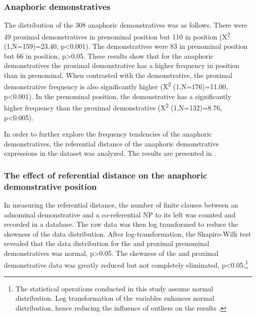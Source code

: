 \documentclass[output=paper,
modfonts
]{langscibook}
\begin{document}
\subsubsection{Anaphoric demonstratives}\label{sec:mwamzandi:3.1.2}

The distribution of the 308 anaphoric demonstratives was as follows. There were 49 proximal demonstratives in prenominal position but 110 in  position (X\textsuperscript{2} (1,N=159)=23.40, p<0.001). The  demonstratives were 83 in prenominal position but 66 in  position, p>0.05. These results show that for the anaphoric demonstratives the proximal demonstrative has a higher frequency in  position than in prenominal. When contrasted with the   demonstrative, the proximal  demonstrative frequency is also significantly higher (X\textsuperscript{2} (1,N=176)=11.00, p<0.001). In the prenominal position, the  demonstrative has a significantly higher frequency than the proximal demonstrative (X\textsuperscript{2} (1,N=132)=8.76, p<0.005).

In order to further explore the frequency tendencies of the anaphoric demonstratives, the referential distance of the anaphoric demonstrative expressions in the dataset was analyzed. The results are presented in .

\subsubsection{The effect of referential distance on the anaphoric demonstrative position}\label{sec:mwamzandi:3.1.3}

In measuring the referential distance, the number of finite clauses between an adnominal demonstrative and a co-referential NP to its left was counted and recorded in a database. The raw data was then log transformed to reduce the skewness of the data distribution. After log-transformation, the Shapiro-Wilk test revealed that the data distribution for the  and proximal prenominal demonstratives was normal, p>0.05. The skewness of the  and proximal  demonstrative data was greatly reduced but not completely eliminated, p<0.05.\footnote{The statistical operations conducted in this study assume normal distribution. Log transformation of the variables enhances normal distribution, hence reducing the influence of outliers on the results \citep{Baayen2008}.}
\end{document}
